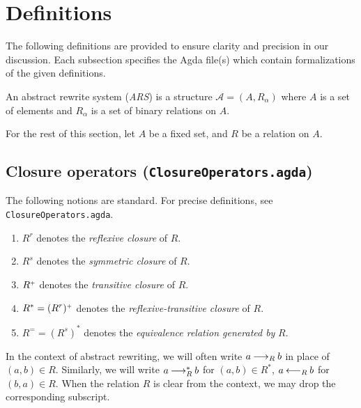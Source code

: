 \section{Definitions}
\label{sec:Definitions}
The following definitions are provided to ensure clarity and precision
in our discussion. Each subsection specifies the Agda file(s) which contain formalizations of the given definitions.

\begin{definition}
    An abstract rewrite system (\emph{ARS}) is a structure $\mathcal{A} = (A, R_\alpha)$ where
     $A$ is a set of elements and $R_\alpha$ is a set of binary relations on $A$.
\end{definition}

For the rest of this section, let $A$ be a fixed set, and $R$ be a relation on $A$.



\subsection{Closure operators (\texttt{ClosureOperators.agda})}
\begin{notation}
  The following notions are standard.  For precise definitions,
  see \texttt{ClosureOperators.agda}.
  \begin{enumerate}
    \item $R^r$ denotes the \emph{reflexive closure} of $R$.
    \item $R^s$ denotes the \emph{symmetric closure} of $R$.
    \item ${R}^{\scriptscriptstyle{+}}$ denotes the \emph{transitive closure} of $R$.
    \item $R^* = (R^r){}^{\scriptscriptstyle{+}}$ denotes the \emph{reflexive-transitive closure} of $R$.
    \item $R^= = (R^s)^*$ denotes the \emph{equivalence relation generated by} $R$.
  \end{enumerate}
\end{notation}




In the context of abstract rewriting, we will often write $a \mathbin{\longrightarrow_R} b$
in place of $(a,b) \in R$.  Similarly, we will write $a \mathbin{\longrightarrow_R^*} b$ for $(a,b) \in R^*$,
$a \mathbin{\longleftarrow_R} b$ for $(b,a) \in R$.  When the relation $R$ is clear from the context,
we may drop the corresponding subscript.

